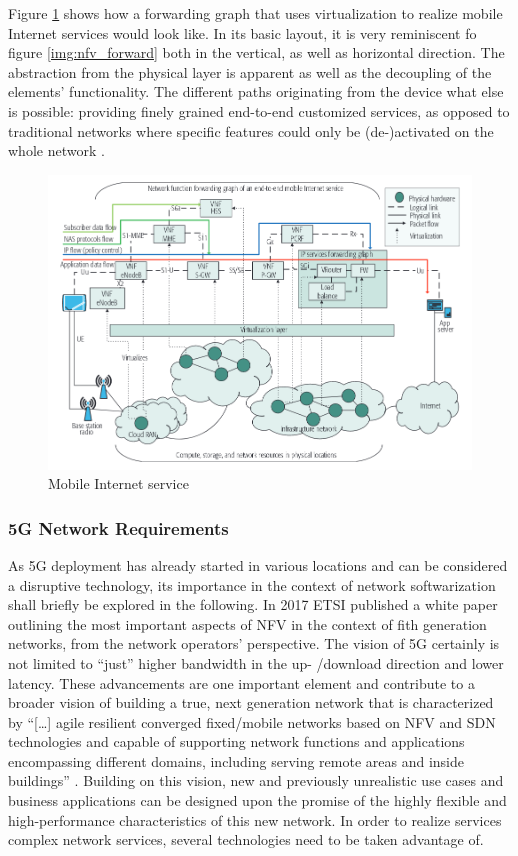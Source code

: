 Figure \ref{img:mobile} shows how a forwarding graph that uses virtualization to realize mobile Internet services would look like. In its basic layout, it is very reminiscent fo figure \ref{img:nfv_forward} both in the vertical, as well as horizontal direction. The abstraction from the physical layer is apparent as well as the decoupling of the elements' functionality. The different paths originating from the device what else is possible: providing finely grained end-to-end customized services, as opposed to traditional networks where specific features could only be (de-)activated on the whole network  \cite{abdelwahab2016network}.

\begin{figure}[h]
	\includegraphics[width=1\linewidth]{images/mobileInternetServices.png}
	\caption{Mobile Internet service \cite{abdelwahab2016network}}
	\label{img:mobile}
\end{figure}

\subsubsection{5G Network Requirements}
As 5G deployment has already started in various locations and can be considered a disruptive technology, its importance in the context of network softwarization shall briefly be explored in the following. In 2017 ETSI published a white paper outlining the most important aspects of NFV in the context of fith generation networks, from the network operators' perspective. The vision of 5G certainly is not limited to ``just'' higher bandwidth in the up- /download  direction and lower latency. These advancements are one important element and contribute to a broader vision of  building a true, next generation network that is characterized by ``[\dots] agile resilient converged fixed/mobile networks based on NFV and SDN technologies and capable of supporting network functions and applications encompassing different domains, including serving remote areas and inside buildings'' \cite{nfv5g}. Building on this vision, new and previously unrealistic use cases and business applications can be designed upon the promise of the highly flexible and high-performance characteristics of this new network. In order to realize services complex network services, several technologies need to be taken advantage of. 


